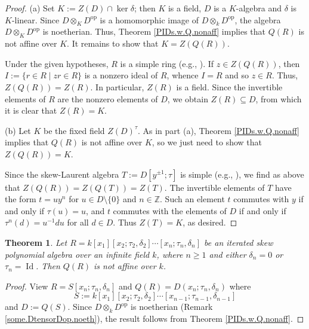 \documentclass{conm-p-l}
\newtheorem{theorem}{Theorem}[section]
\theoremstyle{definition}
\theoremstyle{remark}
\numberwithin{equation}{section}
\newcommand{\ZZ}{\mathbb{Z}}
\DeclareMathOperator{\Id}{Id}
\DeclareMathOperator{\op}{op}
\begin{document}
\begin{proof}
(a) Set $K := Z(D)\cap \ker \delta$; then $K$ is a field, $D$ is a $K$-algebra and $\delta$ is $K$-linear.  Since $D \otimes_K D^{\op}$ is a homomorphic image of $D\otimes_k D^{\op}$, the algebra $D \otimes_K D^{\op}$ is noetherian.  Thus, Theorem \ref{PIDs.w.Q.nonaff} implies that $Q(R)$ is not affine over $K$.   It remains to show that $K = Z(Q(R))$.

Under the given hypotheses, $R$ is a simple ring (e.g., \cite[Proposition 2.1]{Goo-War}).  If $z \in Z(Q(R))$, then $I := \{ r \in R \mid zr \in R \}$ is a nonzero ideal of $R$, whence $I = R$ and so $z \in R$.  Thus, $Z(Q(R)) = Z(R)$.  In particular, $Z(R)$ is a field.  Since the invertible elements of $R$ are the nonzero elements of $D$, we obtain $Z(R) \subseteq D$, from which it is clear that $Z(R) = K$.

(b) Let $K$ be the fixed field $Z(D)^\tau$.  As in part (a), Theorem \ref{PIDs.w.Q.nonaff} implies that $Q(R)$ is not affine over $K$, so we just need to show that $Z(Q(R)) = K$.

Since the skew-Laurent algebra $T := D[y^{\pm1};\tau]$ is simple (e.g., \cite[Theorem 1.17]{Goo-War}), we find as above that $Z(Q(R)) = Z(Q(T)) = Z(T)$.  The invertible elements of $T$ have the form $t = uy^n$ for $u \in D\setminus \{0\}$ and $n \in \ZZ$.  Such an element $t$ commutes with $y$ if and only if $\tau(u) = u$, and $t$ commutes with the elements of $D$ if and only if $\tau^n(d) = u^{-1}du$ for all $d\in D$.  Thus $Z(T) = K$, as desired.
\end{proof}


\begin{theorem}  \label{Q.itOre.nonaff}
Let $R = k[x_1][x_2;\tau_2,\delta_2]\cdots [x_n;\tau_n, \delta_n]$ be an iterated skew polynomial algebra over an infinite field $k$, where $n\ge1$ and either $\delta_n = 0$ or $\tau_n = \Id$.  Then $Q(R)$ is not affine over $k$.
\end{theorem}

\begin{proof}
View $R = S[x_n;\tau_n, \delta_n]$ and $Q(R) = D(x_n;\tau_n, \delta_n)$ where
\begin{equation*}
S := k[x_1][x_2;\tau_2,\delta_2]\cdots [x_{n-1};\tau_{n-1}, \delta_{n-1}]
\end{equation*}
and $D := Q(S)$.  Since $D \otimes_k D^{\op}$ is noetherian (Remark \ref{some.DtensorDop.noeth}), the result follows from Theorem \ref{PIDs.w.Q.nonaff}.
\end{proof}
\end{document}
